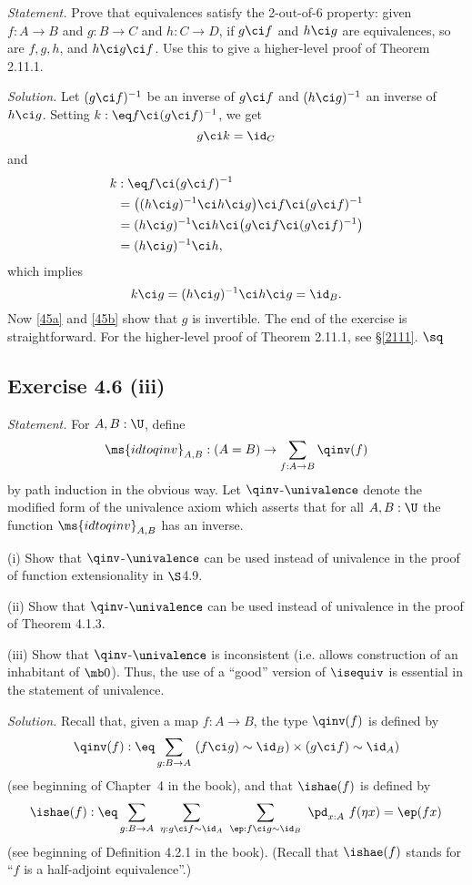 \documentclass[12pt]{article}
\begin{document}
\emph{Statement.} Prove that equivalences satisfy the 2-out-of-6 property: given $f:A\to B$ and $g:B\to C$ and $h:C\to D$, if $g\ci f$ and $h\ci g$ are equivalences, so are $f,g,h$, and $h\ci g\ci f$. Use this to give a higher-level proof of Theorem 2.11.1.

\nn\emph{Solution.} Let $(g\ci f)^{-1}$ be an inverse of $g\ci f$ and $(h\ci g)^{-1}$ an inverse of $h\ci g$. Setting $k:\eq f\ci(g\ci f)^{-1}$, we get 
\begin{equation}\label{45a}
g\ci k=\id_C
\end{equation}
and
\begin{align*}
k&:\eq f\ci (g\ci f)^{-1}\\
&=\big((h\ci g)^{-1}\ci h\ci g\big)\ci f\ci (g\ci f)^{-1}\\
&=(h\ci g)^{-1}\ci h\ci\big(g\ci f\ci (g\ci f)^{-1}\big)\\
&=(h\ci g)^{-1}\ci h,
\end{align*}
which implies 
\begin{equation}\label{45b}
k\ci g=(h\ci g)^{-1}\ci h\ci g=\id_B.
\end{equation} 
Now \eqref{45a} and \eqref{45b} show that $g$ is invertible. The end of the exercise is straightforward. For the higher-level proof of Theorem 2.11.1, see \S\ref{2111}. $\sq$


\subsection{Exercise 4.6 (iii)}

\emph{Statement.} For $A,B:\U$, define
$$
\ms{idtoqinv}_{A,B}:(A=B)\to\sum_{f:A\to B}\qinv(f)
$$
by path induction in the obvious way. Let $\qinv$-$\univalence$ denote the modified form of the univalence axiom which asserts that for all $A,B:\U$ the function $\ms{idtoqinv}_{A,B}$ has an inverse.

\nn(i) Show that $\qinv$-$\univalence$ can be used instead of univalence in the proof of function extensionality in $\S$4.9.

\nn(ii) Show that $\qinv$-$\univalence$ can be used instead of univalence in the proof of Theorem 4.1.3.

\nn(iii) Show that $\qinv$-$\univalence$ is inconsistent (i.e. allows construction of an inhabitant of $\mb0$). Thus, the use of a ``good'' version of $\isequiv$ is essential in the statement of univalence.

\nn\emph{Solution.} Recall that, given a map $f:A\to B$, the type $\qinv(f)$ is defined by 
\begin{equation}\label{qinv}
\qinv(f):\eq\sum_{g:B\to A}\ (f\ci g)\sim\id_B)\times(g\ci f)\sim\id_A)
\end{equation}
(see beginning of Chapter~4 in the book), and that $\ishae(f)$ is defined by 
\begin{equation}\label{ishae}
\ishae(f):\eq\sum_{g:B\to A}\ \sum_{\eta:g\ci f\sim\id_A}\ \sum_{\ep:f\ci g\sim\id_B}\ \pd_{x:A}\ f(\eta x)=\ep(fx)
\end{equation}
(see beginning of Definition 4.2.1 in the book). (Recall that $\ishae(f)$ stands for ``$f$ is a half-adjoint equivalence''.) 
\end{document}
